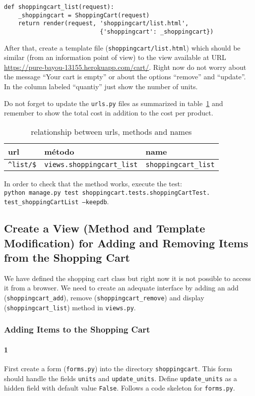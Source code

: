 \documentclass[12pt]{article} %
\newcommand{\herokuurl}[1]{\url{https://pure-bayou-13155.herokuapp.com/#1}}%
\newcommand{\ttt}[1]{\texttt{#1}}%
\newcommand{\views}{\texttt{views.py}}%
\newcommand{\urls}{\texttt{urls.py}}%
\newcommand{\forms}{\texttt{forms.py}}%
\begin{document}
\begin{lstlisting}
def shoppingcart_list(request):
    _shoppingcart = ShoppingCart(request)
    return render(request, 'shoppingcart/list.html',
                           {'shoppingcart': _shoppingcart})
\end{lstlisting}
After that, create a template file (\ttt{shoppingcart/list.html}) which should be similar (from an information  point of view) to the view available at URL \herokuurl{cart/}. Right now do not worry  about the message ``Your cart is empty'' or about the options  ``remove'' and ``update''. In the column labeled ``quantiy'' just show the number of units. 


Do not forget to update the \urls{} files as summarized in  table~\ref{tab:urlsshopping} and remember to show the total cost in addition to the cost per product.

\begin{table}[H]
\centering
\begin{tabular}{lll}
    \textbf{url} & \textbf{método} & \textbf{name} \\ \hline
 \verb|^list/$|  & \verb|views.shoppingcart_list|  & \verb|shoppingcart_list|\\
\end{tabular}
\caption{relationship between urls, methods and names}
\label{tab:urlsshopping}
\end{table}

In order to check that the method works, execute the test:\\ \ttt{python manage.py test shoppingcart.tests.shoppingCartTest.\\test\_shoppingCartList --keepdb}. 

\subsection{Create a View (Method and Template Modification) for Adding and Removing Items from the Shopping Cart}
We have defined the shopping cart class but right now it is not possible to access it from a browser. We need to create an adequate interface by adding an add (\ttt{shoppingcart\_add}), remove (\ttt{shoppingcart\_remove}) and display (\ttt{shoppingcart\_list}) method in \views.

\subsubsection {Adding Items to the Shopping Cart}
\paragraph{1} First create a form (\forms{}) into the directory \ttt{shoppingcart}. This form should handle the fields \ttt{units} and \ttt{update\_units}. Define  \ttt{update\_units} as a hidden field with default value \ttt{False}. Follows a code skeleton for \forms{}.
\end{document}
